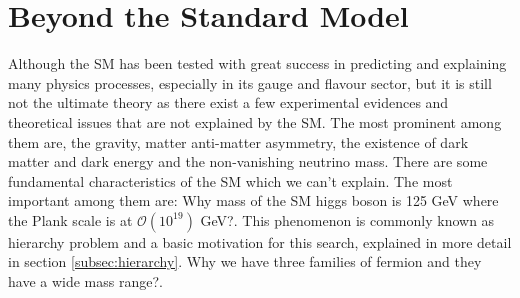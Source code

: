 \section{Beyond the Standard Model}\label{sec:bsm}
Although the SM has been tested with great success in predicting and explaining many physics processes, especially in its gauge and flavour sector, but it is still not the ultimate theory as there exist a few experimental evidences and theoretical issues that are not explained by the SM. The most prominent among them are, the gravity, matter anti-matter asymmetry, the existence of dark matter and dark energy and the non-vanishing neutrino mass. There are some fundamental characteristics of the SM which we can't explain. The most important among them are: Why mass of the SM higgs boson is 125 GeV where the Plank scale is at $\mathcal{O}(10^{19})$ GeV?. This phenomenon is commonly known as hierarchy problem and a basic motivation for this search, explained in more detail in section \ref{subsec:hierarchy}. Why we have three families of fermion and they have a wide mass range?.
